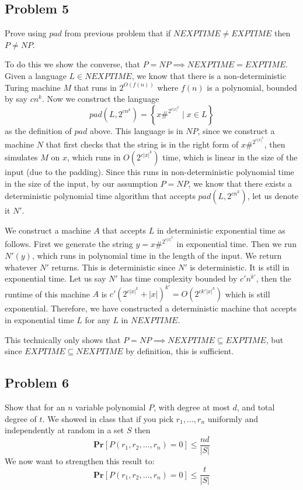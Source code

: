 \documentclass[english]{article}
\begin{document}
\subsection*{Problem 5}
Prove using $pad$ from previous problem that if $NEXPTIME \neq EXPTIME$ then $P \neq NP$. 

To do this we show the converse, that $P = NP \implies NEXPTIME = EXPTIME$. Given a language $L \in NEXPTIME$, we
know that there is a non-deterministic Turing machine $M$ that runs in $2^{O(f(n))}$ where $f(n)$ is a polynomial,
bounded by say $c n^k$. Now we construct the language
\[ pad(L,2^{c n^k}) = \left\{ x\#^{2^{c |x|^k}} \mid x \in L \right\} \]
as the definition of $pad$ above. This language is in $NP$, since we construct a machine $N$ that first checks that
the string is in the right form of $x\#^{2^{c |x|^k}}$, then simulates $M$ on $x$, which runs in $O(2^{c |x|^k})$
time, which is linear in the size of the input (due to the padding). Since this runs in non-deterministic polynomial
time in the size of the input, by our assumption $P = NP$, we know that there exists a deterministic polynomial time
algorithm that accepts $pad(L,2^{c n^k})$, let us denote it $N'$.

We construct a machine $A$ that accepts $L$ in deterministic exponential time as follows. First we generate the
string $y = x\#^{2^{c |x|^k}}$ in exponential time. Then we run $N'(y)$, which runs in polynomial time in 
the length of the input. We return whatever $N'$ returns. This is deterministic since $N'$ is deterministic. It
is still in exponential time. Let us say $N'$ has time complexity bounded by $c' n^{k'}$, then the runtime of this
machine $A$ is $c'\left(2^{c |x|^k} + |x|\right)^{k'} = O(2^{ck' |x|^k})$ which is still exponential. Therefore,
we have constructed a deterministic machine that accepts in exponential time $L$ for any $L$ in $NEXPTIME$.

This technically only shows that $P = NP \implies NEXPTIME \subseteq EXPTIME$, but since
$EXPTIME \subseteq NEXPTIME$ by definition, this is sufficient. 

\subsection*{Problem 6}
Show that for an $n$ variable polynomial $P$, with degree at most $d$, and total degree of $t$. We showed in class
that if you pick $r_1, \ldots, r_n$ uniformly and independently at random in a set $S$ then 
\[ \mathbf{Pr}[P(r_1,r_2,\ldots,r_n) = 0] \le \frac{nd}{|S|} \]
We now want to strengthen this result to:
\[ \mathbf{Pr}[P(r_1,r_2,\ldots,r_n) = 0] \le \frac{t}{|S|} \]
\end{document}
